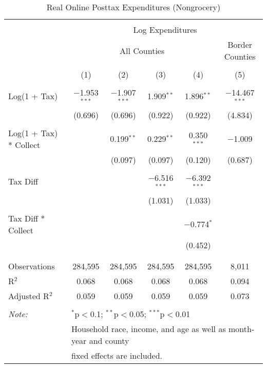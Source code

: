 
\begin{table}[!htbp] \centering 
  \caption{Real Online Posttax Expenditures (Nongrocery)} 
  \label{} 
\begin{tabular}{@{\extracolsep{5pt}}lccccc} 
\\[-1.8ex]\hline 
\hline \\[-1.8ex] 
 & \multicolumn{5}{c}{Log Expenditures} \\ 
\cline{2-6} 
 & \multicolumn{4}{c}{All Counties} & Border Counties \\ 
\\[-1.8ex] & (1) & (2) & (3) & (4) & (5)\\ 
\hline \\[-1.8ex] 
 Log(1 + Tax) & $-$1.953$^{***}$ & $-$1.907$^{***}$ & 1.909$^{**}$ & 1.896$^{**}$ & $-$14.467$^{***}$ \\ 
  & (0.696) & (0.696) & (0.922) & (0.922) & (4.834) \\ 
  & & & & & \\ 
 Log(1 + Tax) * Collect &  & 0.199$^{**}$ & 0.229$^{**}$ & 0.350$^{***}$ & $-$1.009 \\ 
  &  & (0.097) & (0.097) & (0.120) & (0.687) \\ 
  & & & & & \\ 
 Tax Diff &  &  & $-$6.516$^{***}$ & $-$6.392$^{***}$ &  \\ 
  &  &  & (1.031) & (1.033) &  \\ 
  & & & & & \\ 
 Tax Diff * Collect &  &  &  & $-$0.774$^{*}$ &  \\ 
  &  &  &  & (0.452) &  \\ 
  & & & & & \\ 
\hline \\[-1.8ex] 
Observations & 284,595 & 284,595 & 284,595 & 284,595 & 8,011 \\ 
R$^{2}$ & 0.068 & 0.068 & 0.068 & 0.068 & 0.094 \\ 
Adjusted R$^{2}$ & 0.059 & 0.059 & 0.059 & 0.059 & 0.073 \\ 
\hline 
\hline \\[-1.8ex] 
\textit{Note:}  & \multicolumn{5}{l}{$^{*}$p$<$0.1; $^{**}$p$<$0.05; $^{***}$p$<$0.01} \\ 
 & \multicolumn{5}{l}{Household race, income, and age as well as month-year and county} \\ 
 & \multicolumn{5}{l}{fixed effects are included.} \\ 
\end{tabular} 
\end{table} 
